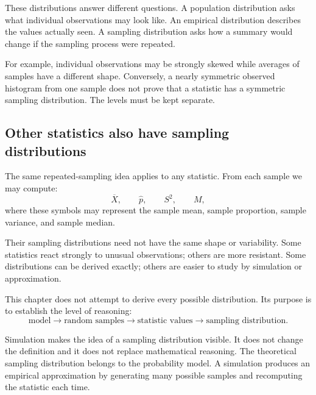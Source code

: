 These distributions answer different questions. A population distribution asks
what individual observations may look like. An empirical distribution describes
the values actually seen. A sampling distribution asks how a summary would
change if the sampling process were repeated.

For example, individual observations may be strongly skewed while averages of
samples have a different shape. Conversely, a nearly symmetric observed
histogram from one sample does not prove that a statistic has a symmetric
sampling distribution. The levels must be kept separate.

\subsection*{Other statistics also have sampling distributions}

The same repeated-sampling idea applies to any statistic. From each sample we may
compute:
\[
\overline X,
\qquad
\widehat p,
\qquad
S^2,
\qquad
M,
\]
where these symbols may represent the sample mean, sample proportion, sample
variance, and sample median.

Their sampling distributions need not have the same shape or variability. Some
statistics react strongly to unusual observations; others are more resistant.
Some distributions can be derived exactly; others are easier to study by
simulation or approximation.

This chapter does not attempt to derive every possible distribution. Its purpose
is to establish the level of reasoning:
\[
\text{model}
\longrightarrow
\text{random samples}
\longrightarrow
\text{statistic values}
\longrightarrow
\text{sampling distribution}.
\]

\begin{summarybox}
Simulation makes the idea of a sampling distribution visible. It does not change
the definition and it does not replace mathematical reasoning. The theoretical
sampling distribution belongs to the probability model. A simulation produces
an empirical approximation by generating many possible samples and recomputing
the statistic each time.
\end{summarybox}
